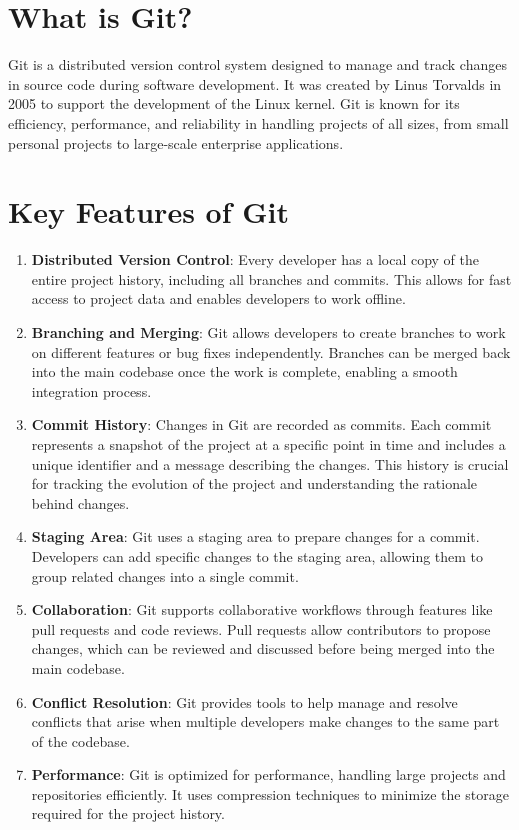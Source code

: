 
\section{What is Git?}

Git is a distributed version control system designed to manage and track changes in source code during software development. It was created by Linus Torvalds in 2005 to support the development of the Linux kernel. Git is known for its efficiency, performance, and reliability in handling projects of all sizes, from small personal projects to large-scale enterprise applications.

\section{Key Features of Git}

\begin{enumerate}
    \item \textbf{Distributed Version Control}: Every developer has a local copy of the entire project history, including all branches and commits. This allows for fast access to project data and enables developers to work offline.
    \item \textbf{Branching and Merging}: Git allows developers to create branches to work on different features or bug fixes independently. Branches can be merged back into the main codebase once the work is complete, enabling a smooth integration process.
    \item \textbf{Commit History}: Changes in Git are recorded as commits. Each commit represents a snapshot of the project at a specific point in time and includes a unique identifier and a message describing the changes. This history is crucial for tracking the evolution of the project and understanding the rationale behind changes.
    \item \textbf{Staging Area}: Git uses a staging area to prepare changes for a commit. Developers can add specific changes to the staging area, allowing them to group related changes into a single commit.
    \item \textbf{Collaboration}: Git supports collaborative workflows through features like pull requests and code reviews. Pull requests allow contributors to propose changes, which can be reviewed and discussed before being merged into the main codebase.
    \item \textbf{Conflict Resolution}: Git provides tools to help manage and resolve conflicts that arise when multiple developers make changes to the same part of the codebase.
    \item \textbf{Performance}: Git is optimized for performance, handling large projects and repositories efficiently. It uses compression techniques to minimize the storage required for the project history.
\end{enumerate}

